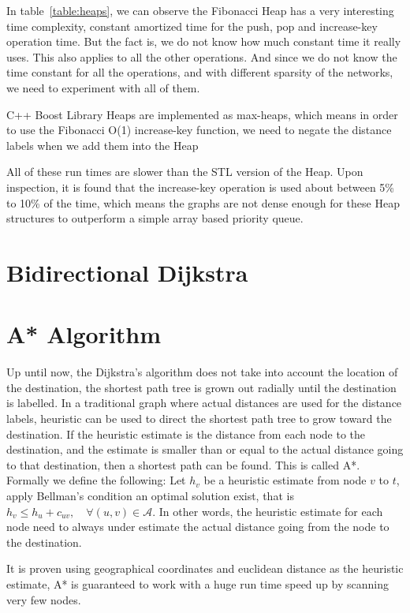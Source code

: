 In table~\ref{table:heaps},
we can observe the Fibonacci Heap has a very interesting time complexity,
constant amortized time for the push, pop and increase-key operation time.
But the fact is,
we do not know how much constant time it really uses.
This also applies to all the other operations.
And since we do not know the time constant for all the operations,
and with different sparsity of the networks,
we need to experiment with all of them.

C++ Boost Library Heaps are implemented as max-heaps,
which means in order to use the Fibonacci O(1) increase-key function,
we need to negate the distance labels when we add them into the Heap


All of these run times are slower than the STL version of the Heap.
Upon inspection,
it is found that the increase-key operation is used about between 5\% to 10\%
of the time,
which means the graphs are not dense enough for these Heap structures to outperform a
simple array based priority queue.

\section{Bidirectional Dijkstra}
\section{A* Algorithm}
Up until now,
the Dijkstra's algorithm does not take into account the location of the destination,
the shortest path tree is grown out radially until the destination is labelled.
In a traditional graph where actual distances are used for the distance labels,
heuristic can be used to direct the shortest path tree to grow toward the destination.
If the heuristic estimate is the distance from each node to the destination,
and the estimate is smaller than or equal to the actual distance going to that destination,
then a shortest path can be found. This is called A*.
Formally we define the following: Let $h_v$ be a heuristic estimate from node $v$ to $t$,
apply Bellman's condition an optimal solution exist, that is 
$ h_v \leq h_u + c_{uv}, \quad \forall(u,v) \in \mathcal{A} $.
In other words, the heuristic estimate for each node need to always under estimate the actual distance
going from the node to the destination.

It is proven using geographical coordinates and euclidean distance as the heuristic estimate,
A* is guaranteed to work with a huge run time speed up by scanning very few nodes.

